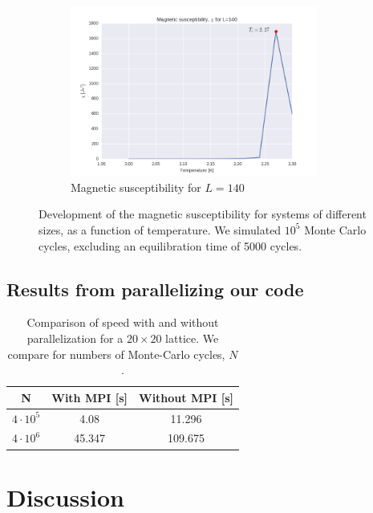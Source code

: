 \documentclass[a4paper, 10pt]{article}
\begin{document}
\begin{figure}[!ht]
\begin{subfigure}[H!]{0.5\textwidth}
        \centering
        \includegraphics[height=2.2in]{chil140.png}
        \caption{Magnetic susceptibility for $L=140$}
    \end{subfigure}
      \caption{Development of the magnetic susceptibility for systems of different sizes, as a function of temperature. We simulated $10^5$ Monte Carlo cycles, excluding an equilibration time of 5000 cycles.}\label{fig:phase_chi}
\end{figure}
\subsection{Results from parallelizing our code}
\begin{table}[!ht]
\centering
\caption{Comparison of speed with and without parallelization for a $20 \times 20$ lattice. We compare for numbers of Monte-Carlo cycles, $N$.}\label{tab:compare_parallelized}
\begin{tabular}{|c|c|c|}
\hline
N & With MPI [s] &  Without MPI [s]\\
\hline
\rule{0pt}{2ex}    
$4\cdot 10^5$ & 4.08 & 11.296 \\
$4 \cdot 10^6$ & 45.347 & 109.675\\ 
\hline
\end{tabular}
\end{table}
\clearpage
\section{Discussion}
\end{document}
